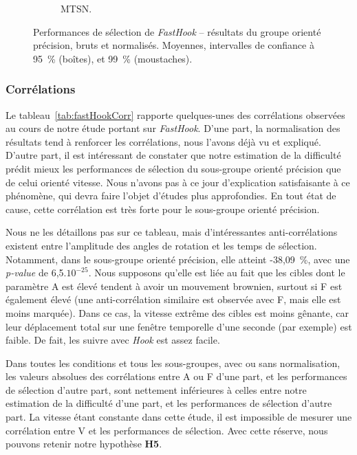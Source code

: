 \begin{figure}[!htb]
\begin{subfigure}[t]{0.49\textwidth}
			\caption{MTSN.}
			\label{fig:phPrNormTimes}
		\end{subfigure}
		\caption[\emph{FastHook} -- résultats III]{Performances de sélection de \emph{FastHook} -- résultats du groupe orienté précision, bruts et normalisés. Moyennes, intervalles de confiance à 95~\%{} (boîtes), et 99~\%{} (moustaches).}
		\label{fig:fastHookPrRes}
	\end{figure}
	

	\subsubsection{Corrélations}
	Le tableau~\ref{tab:fastHookCorr} rapporte quelques-unes des corrélations observées au cours de notre étude portant sur \emph{FastHook}. D'une part, la normalisation des résultats tend à renforcer les corrélations, nous l'avons déjà vu et expliqué. D'autre part, il est intéressant de constater que notre estimation de la difficulté prédit mieux les performances de sélection du sous-groupe orienté précision que de celui orienté vitesse. Nous n'avons pas à ce jour d'explication satisfaisante à ce phénomène, qui devra faire l'objet d'études plus approfondies. En tout état de cause, cette corrélation est très forte pour le sous-groupe orienté précision.
	
	Nous ne les détaillons pas sur ce tableau, mais d'intéressantes anti-corrélations existent entre l'amplitude des angles de rotation et les temps de sélection. Notamment, dans le sous-groupe orienté précision, elle atteint -38,09~\%{}, avec une \emph{p-value} de 6,5$.10^{-25}$. Nous supposons qu'elle est liée au fait que les cibles dont le paramètre A est élevé tendent à avoir un mouvement brownien, surtout si F est également élevé (une anti-corrélation similaire est observée avec F, mais elle est moins marquée). Dans ce cas, la vitesse extrême des cibles est moins gênante, car leur déplacement total sur une fenêtre temporelle d'une seconde (par exemple) est faible. De fait, les \og suivre \fg{} avec \emph{Hook} est assez facile.
	
	Dans toutes les conditions et tous les sous-groupes, avec ou sans normalisation, les valeurs absolues des corrélations entre A ou F d'une part, et les performances de sélection d'autre part, sont nettement inférieures à celles entre notre estimation de la difficulté d'une part, et les performances de sélection d'autre part. La vitesse étant constante dans cette étude, il est impossible de mesurer une corrélation entre V et les performances de sélection. Avec cette réserve, nous pouvons retenir notre hypothèse \textbf{H5}.
	
